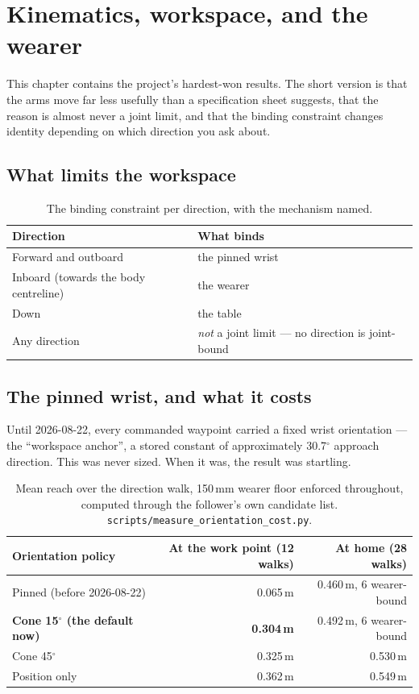 \documentclass[11pt,a4paper,oneside]{report}
\newcommand{\file}[1]{\texttt{\small #1}}
\newcommand{\dg}{$^{\circ}$}
\begin{document}
\chapter{Kinematics, workspace, and the wearer}

This chapter contains the project's hardest-won results. The short version is
that the arms move far less usefully than a specification sheet suggests, that
the reason is almost never a joint limit, and that the binding constraint
changes identity depending on which direction you ask about.

\section{What limits the workspace}

\begin{table}[H]
\centering
\small
\begin{tabular}{@{}ll@{}}
\toprule
\textbf{Direction} & \textbf{What binds} \\
\midrule
Forward and outboard & the pinned wrist \\
Inboard (towards the body centreline) & the wearer \\
Down & the table \\
Any direction & \emph{not} a joint limit --- no direction is joint-bound \\
\bottomrule
\end{tabular}
\caption{The binding constraint per direction, with the mechanism named.}
\end{table}

\section{The pinned wrist, and what it costs}

Until 2026-08-22, every commanded waypoint carried a fixed wrist orientation
--- the ``workspace anchor'', a stored constant of approximately 30.7\dg{}
approach direction. This was never sized. When it was, the result was
startling.

\begin{table}[H]
\centering
\small
\begin{tabular}{@{}lrr@{}}
\toprule
\textbf{Orientation policy} & \textbf{At the work point (12 walks)} & \textbf{At home (28 walks)} \\
\midrule
Pinned (before 2026-08-22) & 0.065\,m & 0.460\,m, 6 wearer-bound \\
\textbf{Cone 15\dg{} (the default now)} & \textbf{0.304\,m} & 0.492\,m, 6 wearer-bound \\
Cone 45\dg & 0.325\,m & 0.530\,m \\
Position only & 0.362\,m & 0.549\,m \\
\bottomrule
\end{tabular}
\caption{Mean reach over the direction walk, 150\,mm wearer floor enforced
throughout, computed through the follower's own candidate list.
\file{scripts/measure\_orientation\_cost.py}.}
\end{table}
\end{document}
